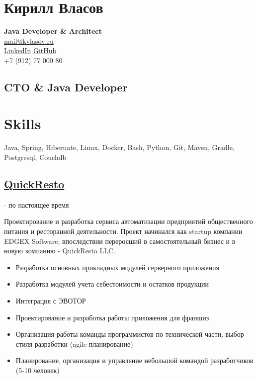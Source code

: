 \documentclass{article}
\begin{document}
\pagestyle{empty}
\setlength{\topskip}{0mm}
\setlength{\parindent}{0pt}
\setlength{\parskip}{4pt}
\raggedright
{}


\justifying
  
\section*{Кирилл Власов}

\textbf{Java Developer \& Architect}\\%
\href{mailto:mail@kvlasov.ru}{mail@kvlasov.ru}\\%
\href{https://ru.linkedin.com/in/kirill-vlasov-48451427}{LinkedIn}
\href{https://github.com/kirill-vlasov}{GitHub}\\%
+7 (912) 77 000 80	

\vspace{1em}

\subsection*{CTO \& Java Developer}


\section*{Skills}
Java, Spring, Hibernate,
Linux, Docker, Bash, Python,
Git, Maven, Gradle,
Postgresql, Couchdb


\subsection*{\href{https://www.quickresto.ru/}{QuickResto}}
 - по настоящее время
\normalsize

Проектирование и разработка сервиса автоматизации предприятий общественного питания и ресторанной деятельности. Проект начинался как startup компании EDGEX Software, впоследствии переросший в самостоятельный бизнес и в новую компанию - QuickResto LLC.

\begin{itemize}
  \item Разработка основных прикладных модулей серверного приложения
  \item Разработка модулей учета себестоимости и остатков продукции
  \item Интеграция с ЭВОТОР
  \item Проектирование и разработка работы приложения для франшиз
  \item Организация работы команды программистов по технической части, выбор стиля разработки (agile планирование)
  \item Планирование, организация и управление небольшой командой разработчиков (5-10 человек)
\end{itemize}
\end{document}
